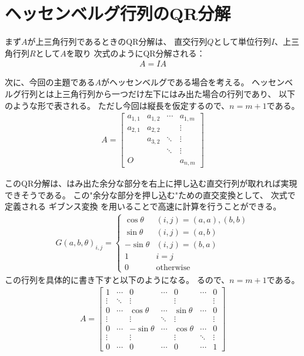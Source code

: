 \documentclass{jarticle}
\begin{document}
\section{ヘッセンベルグ行列のQR分解}
まず$A$が上三角行列であるときのQR分解は、
直交行列$Q$として単位行列$I$、上三角行列$R$として$A$を取り
次式のようにQR分解される：
\begin{align}
A = IA
\end{align}
\par
次に、今回の主題である$A$がヘッセンベルグである場合を考える。
ヘッセンベルグ行列とは上三角行列から一つだけ左下にはみ出た場合の行列であり、
以下のような形で表される。
ただし今回は縦長を仮定するので、$n=m+1$である。
\begin{align}
A = 
\begin{bmatrix}
a_{1,1} & a_{1,2} & \cdots & a_{1,m} \\
a_{2,1} & a_{2,2} &        & \vdots  \\
        & a_{3,2} & \ddots & \vdots  \\
        &         & \ddots & \vdots  \\
O       &         &        & a_{n,m} 
\end{bmatrix}
\end{align}
\par
このQR分解は、はみ出た余分な部分を右上に押し込む直交行列が取れれば実現できそうである。
この"余分な部分を押し込む"ための直交変換として、
次式で定義される
ギブンス変換
を用いることで高速に計算を行うことができる。
\begin{align}
G(a,b,\theta)_{i,j} = 
\begin{cases}
    \cos \theta     & (i,j) = (a,a), (b,b) \\
    \sin \theta     & (i,j) = (a,b) \\
    -\sin \theta    & (i,j) = (b,a) \\
    1               & i=j \\
    0               & \text{otherwise}
\end{cases}
\end{align}
この行列を具体的に書き下すと以下のようになる。
るので、$n=m+1$である。
\begin{align}
A =
\begin{bmatrix}
1       & \cdots    & 0             & \cdots    & 0             & \cdots    & 0         \\
\vdots  & \ddots    & \vdots        &           & \vdots        &           & \vdots    \\
0       & \cdots    & \cos \theta   & \cdots    & \sin \theta   & \cdots    & 0         \\
\vdots  &           & \vdots        & \ddots    & \vdots        &           & \vdots    \\
0       & \cdots    & {-}\sin \theta  & \cdots    & \cos \theta   & \cdots    & 0         \\
\vdots  &           & \vdots        &           & \vdots        & \ddots    & \vdots    \\
0       & \cdots    & 0             & \cdots    & 0             & \cdots    & 1         
\end{bmatrix}
\end{align}
\end{document}
